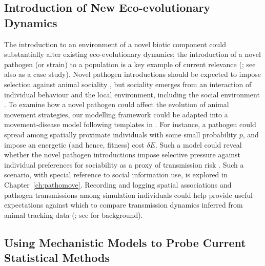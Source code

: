 \subsection*{Introduction of New Eco-evolutionary Dynamics}

The introduction to an environment of a novel biotic component could substantially alter existing eco-evolutionary dynamics; the introduction of a novel pathogen (or strain) to a population is a key example of current relevance (\cite{carlson2022a}; see also \cite{monk2022} as a case study).
Novel pathogen introductions should be expected to impose selection against animal sociality \parencite[e.g.][]{ashby2022}, but sociality emerges from an interaction of individual behaviour and the local environment, including the social environment \parencite{tanner2012}.
To examine how a novel pathogen could affect the evolution of animal movement strategies, our modelling framework could be adapted into a movement-disease model following templates in \textcite{white2018a}.
For instance, a pathogen could spread among spatially proximate individuals with some small probability $p$, and impose an energetic (and hence, fitness) cost $\delta E$.
Such a model could reveal whether the novel pathogen introductions impose selective pressure against individual preferences for sociability as a proxy of transmission risk \parencite{weinstein2018}.
Such a scenario, with special reference to social information use, is explored in Chapter~\ref{ch:pathomove}.
Recording and logging spatial associations and pathogen transmissions among simulation individuals could help provide useful expectations against which to compare transmission dynamics inferred from animal tracking data (\cite{wilber2022}; see \cite{robitaille2019,albery2021} for background).

\subsection*{Using Mechanistic Models to Probe Current Statistical Methods}

